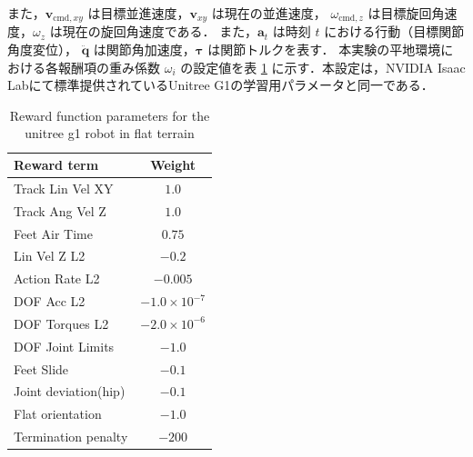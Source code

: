 また，$\mathbf{v}_{\text{cmd}, xy}$ は目標並進速度，$\mathbf{v}_{xy}$ は現在の並進速度，
$\omega_{\text{cmd}, z}$ は目標旋回角速度，$\omega_z$ は現在の旋回角速度である．
また，$\mathbf{a}_t$ は時刻 $t$ における行動（目標関節角度変位），
$\ddot{\mathbf{q}}$ は関節角加速度，$\boldsymbol{\tau}$ は関節トルクを表す．
本実験の平地環境における各報酬項の重み係数 $\omega_{i}$ の設定値を表 \ref{tab:g1_flat_reward_params} に示す．本設定は，NVIDIA Isaac Labにて標準提供されているUnitree G1の学習用パラメータと同一である．

\begin{table}[H]
  \centering
  \caption{Reward function parameters for the unitree g1 robot in flat terrain}
  \label{tab:g1_flat_reward_params}
  \small %
  \begin{tabularx}{\linewidth}{Xc}
      \toprule
      \textbf{Reward term} & \textbf{Weight} \\
      \midrule
      Track Lin Vel XY    & $1.0$ \\
      Track Ang Vel Z     & $1.0$ \\
      Feet Air Time       & $0.75$ \\
      Lin Vel Z L2        & $-0.2$ \\
      Action Rate L2      & $-0.005$ \\
      DOF Acc L2          & $-1.0 \times 10^{-7}$ \\
      DOF Torques L2      & $-2.0 \times 10^{-6}$ \\
      DOF Joint Limits          & $-1.0$ \\
      Feet Slide          & $-0.1$ \\
      Joint deviation(hip)     & $-0.1$ \\
      Flat orientation    & $-1.0$ \\
      Termination penalty & $-200$ \\
      \bottomrule
  \end{tabularx}
\end{table}

\newpage

